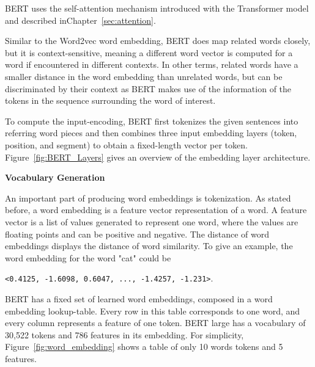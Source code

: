 BERT uses the self-attention mechanism introduced with the Transformer model \cite{vaswani2017attention} and described inChapter~\ref{sec:attention}. 


Similar to the Word2vec word embedding, BERT does map related words closely, but it is context-sensitive, meaning a different word vector is computed for a word if encountered in different contexts. In other terms, related words have a smaller distance in the word embedding than unrelated words, but can be discriminated by their context as BERT makes use of the information of the tokens in the sequence surrounding the word of interest.

To compute the input-encoding, BERT first tokenizes the given sentences into referring word pieces and then combines three input embedding layers (token, position, and segment) to obtain a fixed-length vector per token. Figure~\ref{fig:BERT_Layers} gives an overview of the embedding layer architecture.

\textbf{Vocabulary Generation}

An important part of producing word embeddings is tokenization. As stated before, a word embedding is a feature vector representation of a word. A feature vector is a list of values generated to represent one word, where the values are floating points and can be positive and negative. The distance of word embeddings displays the distance of word similarity. To give an example, the word embedding for the word "cat" could be

\texttt{<0.4125, -1.6098, 0.6047, ..., -1.4257, -1.231>}.


BERT has a fixed set of learned word embeddings, composed in a word embedding lookup-table. Every row in this table corresponds to one word, and every column represents a feature of one token.
BERT large has a vocabulary of 30,522 tokens and 786 features in its embedding. For simplicity, Figure~\ref{fig:word_embedding} shows a table of only 10 words tokens and 5 features.

